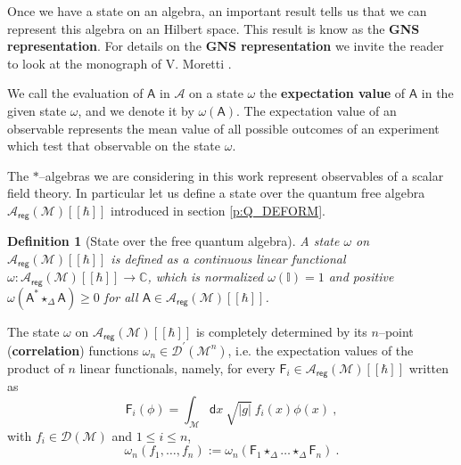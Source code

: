 \documentclass[11pt]{book}
\newcommand{\reg}{\mathsf{reg}}
\newcommand{\abs}[1]{\left|#1\right|}
\newcommand{\Acal}{\mathcal{A}}
\newcommand{\Dcal}{\mathcal{D}}
\newcommand{\Mcal}{\mathcal{M}}
\newcommand{\Cbb}{\mathbb{C}}
\newcommand{\Ibb}{\mathbb{I}}
\newcommand{\Asf}{\mathsf{A}}
\newcommand{\Fsf}{\mathsf{F}}
\newcommand{\dsf}{\mathsf{d}}
\theoremstyle{break}
\newtheorem{definition}{Definition}[chapter]
\begin{document}
Once we have a state on an algebra, an important result tells us that we can represent this algebra on an Hilbert space. This result is know as the \textbf{GNS representation}. For details on the \textbf{GNS representation} we invite the reader to look at the monograph of V. Moretti \cite{MORETTI_2013}.


\bigskip


We call the evaluation of $\Asf$ in $\Acal$ on a state $\omega$ the \textbf{expectation value} of $\Asf$ in the given state $\omega$, and we denote it by $\omega(\Asf)$. The expectation value of an observable represents the mean value of all possible outcomes of an experiment which test that observable on the state $\omega$.


\bigskip


The $\ast$--algebras we are considering in this work represent observables of a scalar field theory. In particular let us define a state over the quantum free algebra $\Acal_\reg(\Mcal)[[\hbar]]$ introduced in section \ref{p:Q_DEFORM}.


\begin{definition}[State over the free quantum algebra]
A state $\omega$ on $\Acal_\reg(\Mcal)[[\hbar]]$ is defined as a continuous linear functional $\omega : \Acal_\reg(\Mcal)[[\hbar]] \to \Cbb$, which is normalized $\omega(\Ibb)=1$ and positive $\omega(\Asf^\ast \star_\Delta \Asf) \geq 0$ for all $\Asf \in \Acal_\reg(\Mcal)[[\hbar]]$.
\end{definition}


The state $\omega$ on $\Acal_\reg(\Mcal)[[\hbar]]$ is completely determined by its $n$--point (\textbf{correlation}) functions $\omega_n \in \Dcal^\prime(\Mcal^n)$, i.e. the expectation values of the product of $n$ linear functionals, namely, for every $\Fsf_i\in \Acal_\reg(\Mcal)[[\hbar]]$ written as
%
\begin{equation*}
\Fsf_i(\phi) = \int_\Mcal \dsf x \ \sqrt{\abs{g}} \ f_i(x) \phi(x) \ , 
\end{equation*}
%
with $f_i \in \Dcal(\Mcal)$ and $1 \leq i \leq n$,
%
\begin{equation*}
\omega_n(f_1, \dots , f_n) := \omega_n(\Fsf_1 \star_\Delta \dots \star_\Delta \Fsf_n) \ .
\end{equation*}
\end{document}

